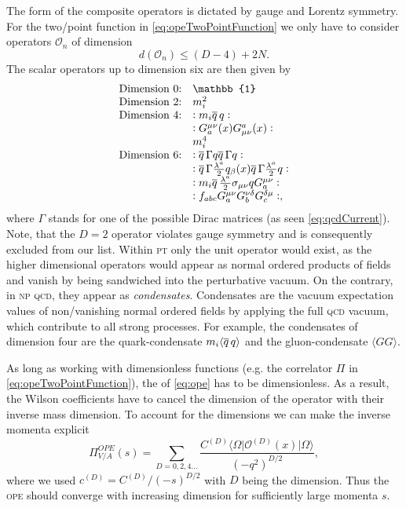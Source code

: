 \documentclass[../../index.tex]{subfiles}
\begin{document}
The form of the composite operators is dictated by gauge and Lorentz symmetry.
For the two\-/point function in \cref{eq:opeTwoPointFunction} we only have to
consider operators \(\mathcal{O}_n\) of dimension
\begin{equation}
  d \left( \mathcal{O}_n \right) \leq (D - 4) + 2N.
\end{equation}
The scalar operators up to dimension six are then given by \cite{Pascual1984}
\begin{equation}
  \begin{array}{ll}
    \text{Dimension 0:} & \mathbb{1} \\
    \text{Dimension 2:} & m_i^2 \\
    \text{Dimension 4:} & :m_i \anti{q} q: \\
                        & :G_a^{\mu\nu}(x) G_{\mu\nu}^a(x): \\
                        & m_i^4 \\
    \text{Dimension 6:} & :\anti{q} \Gamma q \anti{q} \Gamma q: \\
                        & :\anti{q} \Gamma \frac{\lambda^a}{2} q_\beta(x) \anti{q} \Gamma \frac{\lambda^a}{2} q: \\
                        & :m_i \anti{q} \frac{\lambda^a}{2} \sigma_{\mu\nu} q G^{\mu\nu}_a: \\
                        & :f_{abc} G_a^{\mu\nu} G_b^{\nu\delta} G_c^{\delta\mu}:,
  \end{array}
\end{equation}
where \(\Gamma\) stands for one of the possible Dirac matrices (as seen
\cref{eq:qcdCurrent}). Note, that the \(D=2\) operator violates gauge symmetry
and is consequently excluded from our list. Within \textsc{pt} only the unit
operator would exist, as the higher dimensional operators would appear as normal
ordered products of fields and vanish by being sandwiched into the perturbative
vacuum. On the contrary, in \textsc{np qcd}, they appear as \textit{condensates}.
Condensates are the vacuum expectation values of non\-/vanishing normal ordered
fields by applying the full \textsc{qcd} vacuum, which contribute to all strong
processes. For example, the condensates of dimension four are the
quark-condensate \(m_i\langle \overline{q}\, q \rangle\) and the gluon-condensate
\(\langle GG \rangle\).

As long as working with dimensionless functions (e.g. the correlator \(\Pi\) in
\cref{eq:opeTwoPointFunction}), the  of
\cref{eq:ope} has to be dimensionless. As a result, the Wilson coefficients have
to cancel the dimension of the operator with their inverse mass dimension. To
account for the dimensions we can make the inverse momenta explicit
\begin{equation}
  \Pi_{V/A}^{OPE}(s) = \sum_{D=0,2,4\dots} \frac{C^{(D)}
    \langle\Omega\vert \mathcal{O}^{(D)}(x) \vert\Omega\rangle}{(-q^2)^{D/2}},
\end{equation}
where we used \(c^{(D)}=C^{(D)}/(-s)^{D/2}\) with \(D\) being the dimension.
Thus the \textsc{ope} should converge with increasing dimension for sufficiently
large momenta \(s\).
\end{document}
